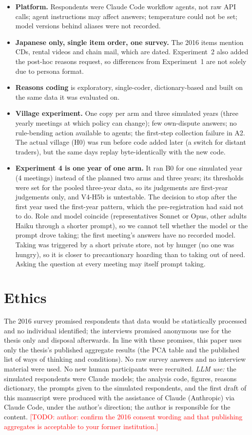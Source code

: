 \documentclass[11pt]{article}
\newcommand{\todo}[1]{\textcolor{red}{[TODO: #1]}}
\begin{document}
\begin{itemize}
  \item \textbf{Platform.} Respondents were Claude Code workflow agents, not raw API calls; agent instructions may affect answers; temperature could not be set; model versions behind aliases were not recorded.
  \item \textbf{Japanese only, single item order, one survey.} The 2016 items mention CDs, rental videos and chain mail, which are dated. Experiment~2 also added the post-hoc reasons request, so differences from Experiment~1 are not solely due to persona format.
  \item \textbf{Reasons coding} is exploratory, single-coder, dictionary-based and built on the same data it was evaluated on.
  \item \textbf{Village experiment.} One copy per arm and three simulated years (three yearly meetings at which policy can change); few own-dispute answers; no rule-bending action available to agents; the first-step collection failure in A2. The actual village (H0) was run before code added later (a switch for distant traders), but the same days replay byte-identically with the new code.
  \item \textbf{Experiment 4 is one year of one arm.} It ran B0 for one simulated year (4 meetings) instead of the planned two arms and three years; its thresholds were set for the pooled three-year data, so its judgements are first-year judgements only, and V4-H5b is untestable. The decision to stop after the first year used the first-year pattern, which the pre-registration had said not to do. Role and model coincide (representatives Sonnet or Opus, other adults Haiku through a shorter prompt), so we cannot tell whether the model or the prompt drove taking; the first meeting's answers have no recorded model. Taking was triggered by a short private store, not by hunger (no one was hungry), so it is closer to precautionary hoarding than to taking out of need. Asking the question at every meeting may itself prompt taking.
\end{itemize}

\section{Ethics}
The 2016 survey promised respondents that data would be statistically processed and no individual identified; the interviews promised anonymous use for the thesis only and disposal afterwards. In line with these promises, this paper uses only the thesis's published aggregate results (the PCA table and the published list of ways of thinking and conditions). No raw survey answers and no interview material were used. No new human participants were recruited. \emph{LLM use:} the simulated respondents were Claude models; the analysis code, figures, reasons dictionary, the prompts given to the simulated respondents, and the first draft of this manuscript were produced with the assistance of Claude (Anthropic) via Claude Code, under the author's direction; the author is responsible for the content. \todo{author: confirm the 2016 consent wording and that publishing aggregates is acceptable to your former institution.}
\end{document}
